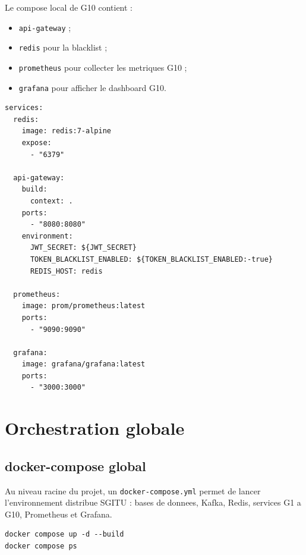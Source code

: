 \documentclass[12pt,a4paper]{article}
\begin{document}
Le compose local de G10 contient :

\begin{itemize}
  \item \texttt{api-gateway} ;
  \item \texttt{redis} pour la blacklist ;
  \item \texttt{prometheus} pour collecter les metriques G10 ;
  \item \texttt{grafana} pour afficher le dashboard G10.
\end{itemize}

\begin{lstlisting}[style=code]
services:
  redis:
    image: redis:7-alpine
    expose:
      - "6379"

  api-gateway:
    build:
      context: .
    ports:
      - "8080:8080"
    environment:
      JWT_SECRET: ${JWT_SECRET}
      TOKEN_BLACKLIST_ENABLED: ${TOKEN_BLACKLIST_ENABLED:-true}
      REDIS_HOST: redis

  prometheus:
    image: prom/prometheus:latest
    ports:
      - "9090:9090"

  grafana:
    image: grafana/grafana:latest
    ports:
      - "3000:3000"
\end{lstlisting}

\newpage

\section{Orchestration globale}

\subsection{docker-compose global}

Au niveau racine du projet, un \texttt{docker-compose.yml} permet de lancer l'environnement distribue SGITU : bases de donnees, Kafka, Redis, services G1 a G10, Prometheus et Grafana.

\begin{lstlisting}[style=code]
docker compose up -d --build
docker compose ps
\end{lstlisting}
\end{document}
